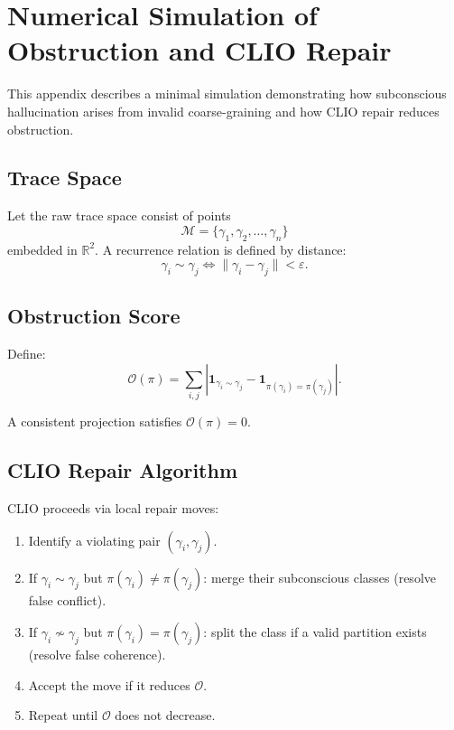 \documentclass[12pt,a4paper]{article}
\begin{document}
\appendix
\section{Numerical Simulation of Obstruction and CLIO Repair}
\label{app:clio}

This appendix describes a minimal simulation demonstrating how subconscious hallucination arises from invalid coarse-graining and how CLIO repair reduces obstruction.

\subsection{Trace Space}

Let the raw trace space consist of points
\[
\mathcal{M} = \{\gamma_1,\gamma_2,\ldots,\gamma_n\}
\]
embedded in $\mathbb{R}^2$. A recurrence relation is defined by distance:
\[
\gamma_i \sim \gamma_j \iff \|\gamma_i-\gamma_j\| < \varepsilon.
\]

\subsection{Obstruction Score}

Define:
\[
\mathcal{O}(\pi)
=
\sum_{i,j}
\left|
\mathbf{1}_{\gamma_i \sim \gamma_j}
-
\mathbf{1}_{\pi(\gamma_i)=\pi(\gamma_j)}
\right|.
\]

A consistent projection satisfies $\mathcal{O}(\pi) = 0$.

\subsection{CLIO Repair Algorithm}

CLIO proceeds via local repair moves:

\begin{enumerate}
\item Identify a violating pair $(\gamma_i,\gamma_j)$.
\item If $\gamma_i \sim \gamma_j$ but $\pi(\gamma_i) \neq \pi(\gamma_j)$: merge their subconscious classes (resolve false conflict).
\item If $\gamma_i \not\sim \gamma_j$ but $\pi(\gamma_i) = \pi(\gamma_j)$: split the class if a valid partition exists (resolve false coherence).
\item Accept the move if it reduces $\mathcal{O}$.
\item Repeat until $\mathcal{O}$ does not decrease.
\end{enumerate}
\end{document}
